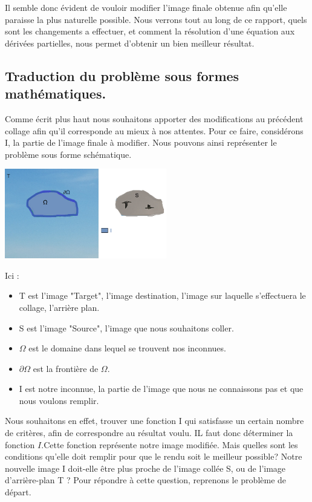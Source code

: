 Il semble donc évident de vouloir modifier l'image finale obtenue afin qu'elle paraisse la plus naturelle possible. Nous verrons tout au long de ce rapport, quels sont les changements a effectuer, et comment la résolution d'une équation aux dérivées partielles, nous permet d'obtenir un bien meilleur résultat. 


\subsection{Traduction du problème sous formes mathématiques.}

Comme écrit plus haut nous souhaitons apporter des modifications au précédent collage afin qu'il corresponde au mieux à nos attentes. Pour ce faire, considérons I, la partie de l'image finale à modifier. Nous pouvons ainsi représenter le problème sous forme schématique. 
\begin{center}
    \includegraphics[width = 200pt]{Images/Schee.jpg}
\end{center}

Ici : 
\begin{itemize}
    \item T est l'image "Target", l'image destination, l'image sur laquelle s'effectuera le collage, l'arrière plan. 
    \item S est l'image "Source", l'image que nous souhaitons coller.
    \item $\Omega$ est le domaine dans lequel se trouvent nos inconnues.
    \item $\partial \Omega$ est la frontière de $\Omega$.
    \item I est notre inconnue, la partie de l'image que nous ne connaissons pas et que nous voulons remplir.
\end{itemize}

Nous souhaitons en effet, trouver une fonction I qui satisfasse un certain nombre de critères, afin de correspondre au résultat voulu.  
IL faut donc déterminer la fonction $I$.Cette fonction représente notre image modifiée. Mais quelles sont les conditions qu'elle doit remplir pour que le rendu soit le meilleur possible? Notre nouvelle image I doit-elle être plus proche de l'image collée S, ou de l'image d'arrière-plan T ? \newline
Pour répondre à cette question, reprenons le problème de départ. \newline

